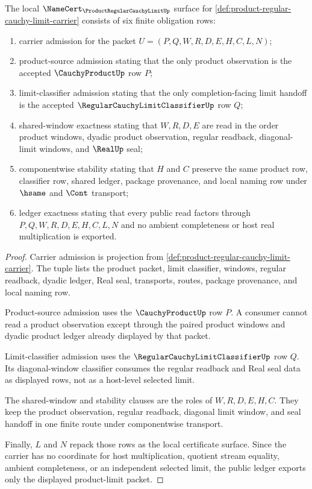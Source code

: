 \begin{theorem}
\label{thm:product-regular-cauchy-limit-namecert-obligations}
The local $\NameCert_{\ProductRegularCauchyLimitUp}$ surface for \autoref{def:product-regular-cauchy-limit-carrier} consists of six finite obligation rows:
\begin{enumerate}
\item carrier admission for the packet $U=(P,Q,W,R,D,E,H,C,L,N)$;
\item product-source admission stating that the only product observation is the accepted $\CauchyProductUp$ row $P$;
\item limit-classifier admission stating that the only completion-facing limit handoff is the accepted $\RegularCauchyLimitClassifierUp$ row $Q$;
\item shared-window exactness stating that $W,R,D,E$ are read in the order product windows, dyadic product observation, regular readback, diagonal-limit windows, and $\RealUp$ seal;
\item componentwise stability stating that $H$ and $C$ preserve the same product row, classifier row, shared ledger, package provenance, and local naming row under $\hsame$ and $\Cont$ transport;
\item ledger exactness stating that every public read factors through $P,Q,W,R,D,E,H,C,L,N$ and no ambient completeness or host real multiplication is exported.
\end{enumerate}
\end{theorem}
\begin{proof}
Carrier admission is projection from \autoref{def:product-regular-cauchy-limit-carrier}. The tuple lists the product packet, limit classifier, windows, regular readback, dyadic ledger, Real seal, transports, routes, package provenance, and local naming row.

Product-source admission uses the $\CauchyProductUp$ row $P$. A consumer cannot read a product observation except through the paired product windows and dyadic product ledger already displayed by that packet.

Limit-classifier admission uses the $\RegularCauchyLimitClassifierUp$ row $Q$. Its diagonal-window classifier consumes the regular readback and Real seal data as displayed rows, not as a host-level selected limit.

The shared-window and stability clauses are the roles of $W,R,D,E,H,C$. They keep the product observation, regular readback, diagonal limit window, and seal handoff in one finite route under componentwise transport.

Finally, $L$ and $N$ repack those rows as the local certificate surface. Since the carrier has no coordinate for host multiplication, quotient stream equality, ambient completeness, or an independent selected limit, the public ledger exports only the displayed product-limit packet.
\end{proof}

